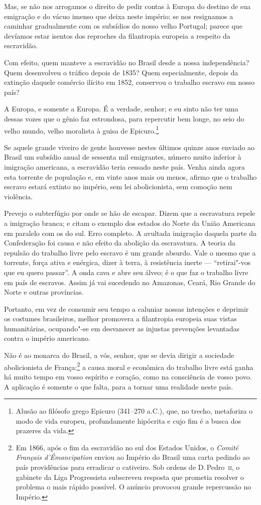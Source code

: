 \begin{linenumbers}
 Mas, se não nos arrogamos o direito de pedir contas à Europa do destino
de sua emigração e do vácuo imenso que deixa neste império; se nos
resignamos a caminhar gradualmente com os subsídios do nosso velho
Portugal; parece que devíamos estar isentos dos reproches da
filantropia europeia a respeito da escravidão.

 Com efeito, quem manteve a escravidão no Brasil desde a nossa
independência? Quem desenvolveu o tráfico depois de 1835? Quem
especialmente, depois da extinção daquele comércio ilícito em 1852,
conservou o trabalho escravo em nosso país?

 A Europa, e somente a Europa. É a verdade, senhor; e eu sinto não ter
uma dessas vozes que o gênio faz estrondosa, para repercutir bem longe,
no seio do velho mundo, velho moralista à guisa de
Epicuro.\footnote{ Alusão ao filósofo grego Epicuro (341--270 a.C.), que, no trecho, metaforiza
o modo de vida europeu, profundamente hipócrita e cujo fim é a busca dos prazeres da vida.} 

 Se aquele grande viveiro de gente houvesse nestes últimos quinze anos
enviado ao Brasil um subsídio anual de sessenta mil emigrantes, número
muito inferior à imigração americana, a escravidão teria cessado neste
país. Venha ainda agora esta torrente de população e, em vinte anos
mais ou menos, afirmo que o trabalho escravo estará extinto no império,
sem lei abolicionista, sem comoção nem violência.

 Prevejo o subterfúgio por onde se hão de escapar. Dizem que a
escravatura repele a imigração branca; e citam o exemplo dos estados do
Norte da União Americana em paralelo com os do sul. Erro completo. A
avultada imigração daquela parte da Confederação foi causa e não efeito
da abolição da escravatura. A teoria da repulsão do trabalho livre pelo
escravo é um grande absurdo. Vale o mesmo que a torrente, força ativa e
enérgica, dizer à terra, à resistência inerte --- ``retirai"-vos que eu
quero passar''. A onda cava e abre seu álveo; é o que faz o trabalho
livre em país de escravos. Assim já vai sucedendo no Amazonas, Ceará,
Rio Grande do Norte e outras províncias. 

 Portanto, em vez de consumir seu tempo a caluniar nossas intenções e
deprimir os costumes brasileiros, melhor promovera a filantropia
europeia suas vistas humanitárias, ocupando"-se em desvanecer as
injustas prevenções levantadas contra o império americano. 

Não é ao monarca do Brasil, a vós, senhor, que se devia dirigir a
sociedade abolicionista de França:\footnote{ Em 1866, após o fim da escravidão no sul dos 
Estados Unidos, o \textit{Comité Français d'Émancipation} enviou ao Império do Brasil uma 
carta pedindo ao país providências para erradicar o cativeiro. Sob ordens de D.\,Pedro~\textsc{ii}, 
o gabinete da Liga Progressista subscreveu resposta que prometia resolver o problema o mais rápido 
possível. O anúncio provocou grande repercussão no Império.} 
a causa moral e econômica do trabalho livre está ganha há muito tempo
em vosso espírito e coração, como na consciência de vosso povo. A
aplicação é somente o que falta, para a tornar uma realidade neste país.


\end{linenumbers}
